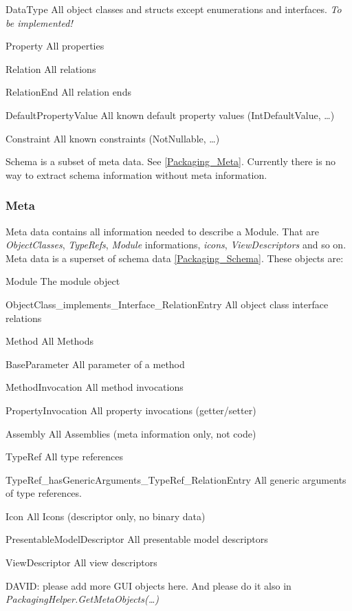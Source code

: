 \begin{descriptionBorder}
	\item[DataType] { All object classes and structs except enumerations and interfaces. \emph{To be implemented!} }
	\item[Property] { All properties }
	\item[Relation] { All relations }
	\item[RelationEnd] { All relation ends }
	\item[DefaultPropertyValue] { All known default property values (IntDefaultValue, \ldots) }
	\item[Constraint] { All known constraints (NotNullable, \ldots) }
\end{descriptionBorder}

\par
Schema is a subset of meta data. See \ref{Packaging_Meta}. Currently there is no way to extract schema information without meta information.


\subsubsection{\label{Packaging_Meta}Meta}

Meta data contains all information needed to describe a Module. That are \emph{ObjectClasses}, \emph{TypeRefs}, \emph{Module} informations, \emph{icons}, \emph{ViewDescriptors} and so on. 
Meta data is a superset of schema data \ref{Packaging_Schema}. These objects are:

\begin{descriptionBorder}
	\item[Module] { The module object }
	\item[ObjectClass\_implements\_Interface\_RelationEntry] { All object class interface relations }
	\item[Method] { All Methods }
	\item[BaseParameter] { All parameter of a method }
	\item[MethodInvocation] { All method invocations }
	\item[PropertyInvocation] { All property invocations (getter/setter) }
	\item[Assembly] { All Assemblies (meta information only, not code) }
	\item[TypeRef] { All type references }
	\item[TypeRef\_hasGenericArguments\_TypeRef\_RelationEntry] { All generic arguments of type references. }
	\item[Icon] { All Icons (descriptor only, no binary data) }
	\item[PresentableModelDescriptor] { All presentable model descriptors }
	\item[ViewDescriptor] { All view descriptors }
	\item[DAVID: ] { please add more GUI objects here. And please do it also in \emph{PackagingHelper.GetMetaObjects(\ldots)} }
\end{descriptionBorder}

